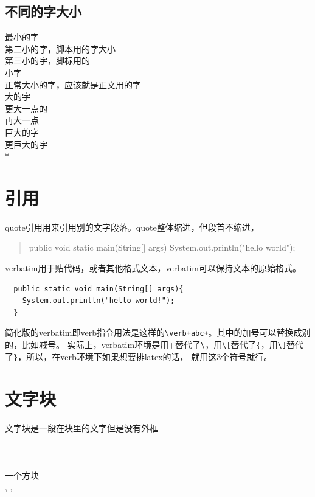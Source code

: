 \documentclass[a4paper,12pt]{article} %
\begin{document}
 \subsection*{不同的字大小} %
 {\tiny 最小的字 }\\
 {\scriptsize 第二小的字，脚本用的字大小}\\
 {\footnotesize 第三小的字，脚标用的}\\
 {\small 小字}\\
 {\normalsize 正常大小的字，应该就是正文用的字 }\\
 {\large 大的字 }\\
 {\Large 更大一点的}\\
 {\LARGE 再大一点}\\
 {\huge 巨大的字}\\
 {\Huge 更巨大的字}\\* %


 \section{引用}
 quote引用用来引用别的文字段落。quote整体缩进，但段首不缩进，
 \begin{quote}
   public void static main(String[] args){
     System.out.println("hello world");
   }
  \end{quote}
 
 verbatim用于贴代码，或者其他格式文本，verbatim可以保持文本的原始格式。
\begin{verbatim}
  public static void main(String[] args){
    System.out.println("hello world!");
  }
\end{verbatim}
 简化版的verbatim即verb指令用法是这样的\verb-\verb+abc+-。其中的加号可以替换成别的，比如减号。
 实际上，verbatim环境是用+替代了\verb-\-，用\verb-\[-替代了\verb-{-，用\verb-\]-替代了\verb-}-，所以，在verb环境下如果想要排latex的话， 就用这3个符号就行。


 \section{文字块}
 \mbox{文字块是一段在块里的文字\\但是没有外框}\\
 \\
 \\
 \\
 一个方块
 \framebox{\rule{3mm}{0pt}\rule{0pt}{3mm}}\\
 \newsavebox{\savbox}
 \usebox{\savbox}, \usebox{\savbox}, \usebox{\savbox}\\
\end{document}
